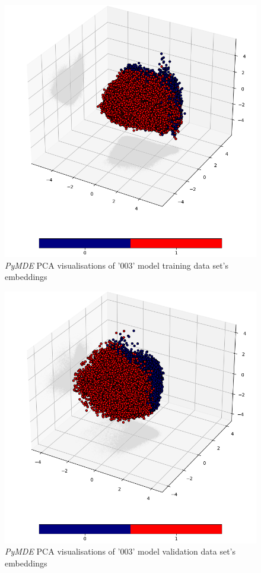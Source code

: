 \documentclass[12pt]{article}
\begin{document}
	\begin{figure}[h!]
		\centering
		\includegraphics[scale=0.5]{003_train_v2_MDE_PCA.png}

		\caption{\textit{PyMDE} PCA visualisations of '003' model training 
		data set's embeddings }
		\label{figure:trainingPyMDEPCAembeddings003}
	\end{figure}

	\begin{figure}[h!]
		\centering
		\includegraphics[scale=0.5]{003_validate_v2_MDE_PCA.png}

		\caption{\textit{PyMDE} PCA visualisations of '003' model 
		validation data set's embeddings }
		\label{figure:validationPyMDEPCAembeddings003}
	\end{figure}
\end{document}

